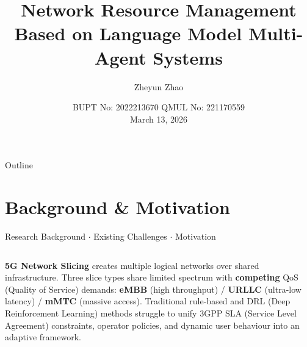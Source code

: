 \documentclass[9pt,aspectratio=169]{beamer}
\title[Network Resource Management Based on Language Model Multi-Agent Systems]{Network Resource Management \\ Based on Language Model Multi-Agent Systems}
\author{Zheyun Zhao}
\institute{Mid-Term Review}
\date{\small{BUPT No: 2022213670 \quad QMUL No: 221170559}\\[8pt]March 13, 2026}
\begin{document}
\maketitle

\begin{frame}{Outline}
\tableofcontents
\end{frame}

\section{Background \& Motivation}
\begin{frame}{Research Background $\cdot$ Existing Challenges $\cdot$ Motivation}
\begin{columns}[T]
{\scriptsize\textbf{5G Network Slicing} creates multiple logical networks over shared infrastructure. Three slice types share limited spectrum with \textbf{competing} QoS (Quality of Service) demands: \textcolor{embbcolor}{\textbf{eMBB}} (high throughput) / \textcolor{urllccolor}{\textbf{URLLC}} (ultra-low latency) / \textcolor{mmtccolor}{\textbf{mMTC}} (massive access). Traditional rule-based and DRL (Deep Reinforcement Learning) methods struggle to unify 3GPP SLA (Service Level Agreement) constraints, operator policies, and dynamic user behaviour into an adaptive framework.}

\begin{table}
\centering\setlength{\tabcolsep}{2pt}\renewcommand{\arraystretch}{1.1}
\end{table}


\end{columns}
\end{frame}
\end{document}
